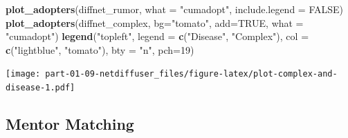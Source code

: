 \documentclass[
]{book}
\newenvironment{Shaded}{\begin{snugshade}}{\end{snugshade}}
\newcommand{\AttributeTok}[1]{\textcolor[rgb]{0.13,0.29,0.53}{#1}}
\newcommand{\CommentTok}[1]{\textcolor[rgb]{0.56,0.35,0.01}{\textit{#1}}}
\newcommand{\ConstantTok}[1]{\textcolor[rgb]{0.56,0.35,0.01}{#1}}
\newcommand{\DecValTok}[1]{\textcolor[rgb]{0.00,0.00,0.81}{#1}}
\newcommand{\FunctionTok}[1]{\textcolor[rgb]{0.13,0.29,0.53}{\textbf{#1}}}
\newcommand{\NormalTok}[1]{#1}
\newcommand{\OtherTok}[1]{\textcolor[rgb]{0.56,0.35,0.01}{#1}}
\newcommand{\SpecialCharTok}[1]{\textcolor[rgb]{0.81,0.36,0.00}{\textbf{#1}}}
\newcommand{\StringTok}[1]{\textcolor[rgb]{0.31,0.60,0.02}{#1}}
\begin{document}
\begin{Shaded}
\begin{Highlighting}[]
\FunctionTok{plot\_adopters}\NormalTok{(diffnet\_rumor, }\AttributeTok{what =} \StringTok{"cumadopt"}\NormalTok{, }\AttributeTok{include.legend =} \ConstantTok{FALSE}\NormalTok{)}
\FunctionTok{plot\_adopters}\NormalTok{(diffnet\_complex, }\AttributeTok{bg=}\StringTok{"tomato"}\NormalTok{, }\AttributeTok{add=}\ConstantTok{TRUE}\NormalTok{, }\AttributeTok{what =} \StringTok{"cumadopt"}\NormalTok{)}
\FunctionTok{legend}\NormalTok{(}\StringTok{"topleft"}\NormalTok{, }\AttributeTok{legend =} \FunctionTok{c}\NormalTok{(}\StringTok{"Disease"}\NormalTok{, }\StringTok{"Complex"}\NormalTok{), }\AttributeTok{col =} \FunctionTok{c}\NormalTok{(}\StringTok{"lightblue"}\NormalTok{, }\StringTok{"tomato"}\NormalTok{),}
       \AttributeTok{bty =} \StringTok{"n"}\NormalTok{, }\AttributeTok{pch=}\DecValTok{19}\NormalTok{)}
\end{Highlighting}
\end{Shaded}

\texttt{[image: part-01-09-netdiffuser\_files/figure-latex/plot-complex-and-disease-1.pdf]}

\hypertarget{mentor-matching}{%
\subsection{Mentor Matching}\label{mentor-matching}}

\begin{Shaded}
\end{Shaded}
\end{document}
